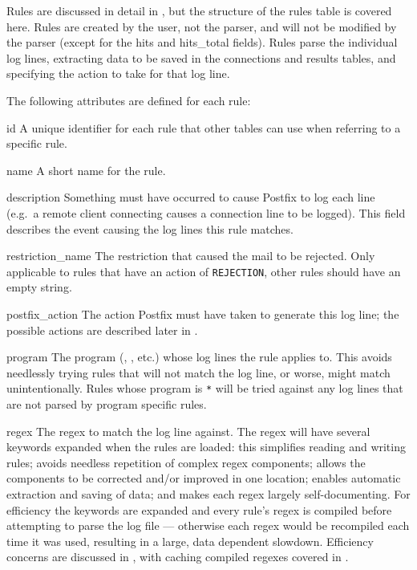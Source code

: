 \label{rule attributes}

Rules are discussed in detail in , but the structure of
the rules table is covered here.  Rules are created by the user, not the
parser, and will not be modified by the parser (except for the hits and
hits\_total fields).  Rules parse the individual log lines, extracting data
to be saved in the connections and results tables, and specifying the
action to take for that log line.

The following attributes are defined for each rule:

\begin{eqlist}

    \item [id] A unique identifier for each rule that other tables can use
        when referring to a specific rule.

    \item [name] A short name for the rule.

    \item [description] Something must have occurred to cause Postfix to
        log each line (e.g.\ a remote client connecting causes a connection
        line to be logged).  This field describes the event causing the log
        lines this rule matches.

    \item [restriction\_name] The restriction that caused the mail to be
        rejected.  Only applicable to rules that have an action of
        \texttt{REJECTION}, other rules should have an empty string.

    \item [postfix\_action] The action Postfix must have taken to generate
        this log line; the possible actions are described later in
        .

    \item [program] The program (, , etc.) whose
        log lines the rule applies to.  This avoids needlessly trying rules
        that will not match the log line, or worse, might match
        unintentionally.  Rules whose program is \texttt{*} will be tried
        against any log lines that are not parsed by program specific
        rules.

    \item [regex] The regex to match the log line against.  The regex will
        have several keywords expanded when the rules are loaded: this
        simplifies reading and writing rules; avoids needless repetition of
        complex regex components; allows the components to be corrected
        and/or improved in one location; enables automatic extraction and
        saving of data; and makes each regex largely self-documenting.  For
        efficiency the keywords are expanded and every rule's regex is
        compiled before attempting to parse the log file --- otherwise each
        regex would be recompiled each time it was used, resulting in a
        large, data dependent slowdown.  Efficiency concerns are discussed
        in , with caching compiled regexes
        covered in .


\end{eqlist}

